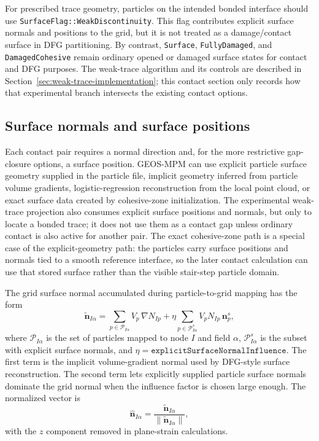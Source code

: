 For prescribed trace geometry, particles on the intended bonded interface should use \texttt{SurfaceFlag::WeakDiscontinuity}.  This flag contributes explicit surface normals and positions to the grid, but it is not treated as a damage/contact surface in DFG partitioning.  By contrast, \texttt{Surface}, \texttt{FullyDamaged}, and \texttt{DamagedCohesive} remain ordinary opened or damaged surface states for contact and DFG purposes.  The weak-trace algorithm and its controls are described in Section~\ref{sec:weak-trace-implementation}; this contact section only records how that experimental branch intersects the existing contact options.

\subsection{Surface normals and surface positions}
\label{subsec:contact-surface-geometry}

Each contact pair requires a normal direction and, for the more restrictive gap-closure options, a surface position.  GEOS-MPM can use explicit particle surface geometry supplied in the particle file, implicit geometry inferred from particle volume gradients, logistic-regression reconstruction from the local point cloud, or exact surface data created by cohesive-zone initialization.  The experimental weak-trace projection also consumes explicit surface positions and normals, but only to locate a bonded trace; it does not use them as a contact gap unless ordinary contact is also active for another pair.  The exact cohesive-zone path is a special case of the explicit-geometry path: the particles carry surface positions and normals tied to a smooth reference interface, so the later contact calculation can use that stored surface rather than the visible stair-step particle domain.

The grid surface normal accumulated during particle-to-grid mapping has the form
\begin{equation}
  \widetilde{\mathbf{n}}_{I\alpha}
  =\sum_{p\in\mathcal{P}_{I\alpha}} V_p\,\nabla N_{Ip}
  +\eta\sum_{p\in\mathcal{P}^{s}_{I\alpha}} V_p N_{Ip}\,\mathbf{n}^{s}_p,
  \label{eq:contact-normal-scatter}
\end{equation}
where $\mathcal{P}_{I\alpha}$ is the set of particles mapped to node $I$ and field $\alpha$, $\mathcal{P}^{s}_{I\alpha}$ is the subset with explicit surface normals, and $\eta=\texttt{explicitSurfaceNormalInfluence}$.  The first term is the implicit volume-gradient normal used by DFG-style surface reconstruction.  The second term lets explicitly supplied particle surface normals dominate the grid normal when the influence factor is chosen large enough.  The normalized vector is
\begin{equation}
  \hat{\mathbf{n}}_{I\alpha}=\frac{\widetilde{\mathbf{n}}_{I\alpha}}{\|\widetilde{\mathbf{n}}_{I\alpha}\|},
\end{equation}
with the $z$ component removed in plane-strain calculations.

